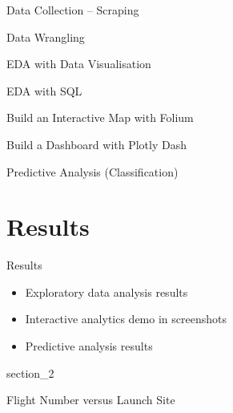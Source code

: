 \begin{frame}{Data Collection -- Scraping}
\end{frame}

\begin{frame}{Data Wrangling}

\end{frame}

\begin{frame}{EDA with Data Visualisation}

\end{frame}

\begin{frame}{EDA with SQL}

\end{frame}

\begin{frame}{Build an Interactive Map with Folium}

\end{frame}

\begin{frame}{Build a Dashboard with Plotly Dash}

\end{frame}

\begin{frame}{Predictive Analysis (Classification)}

\end{frame}

\section{Results}

\begin{frame}{Results}
    \begin{itemize}
        \item Exploratory data analysis results
        \item Interactive analytics demo in screenshots
        \item Predictive analysis results
    \end{itemize}
\end{frame}

{
{section_2}
\begin{frame}[plain]
\end{frame}
}

\begin{frame}{Flight Number versus Launch Site}

\end{frame}

